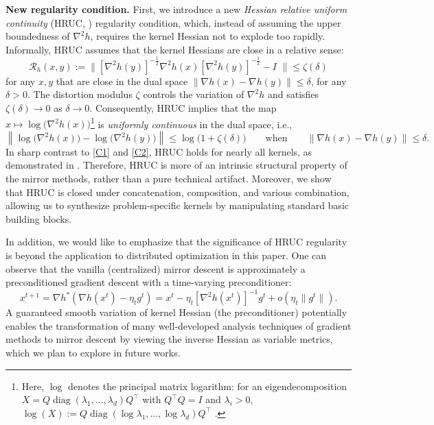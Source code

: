 \documentclass{article}
\theoremstyle{plain}
\theoremstyle{definition}
\theoremstyle{remark}
\newcommand{\cR}{\mathcal{R}}
\begin{document}
\noindent\textbf{New regularity condition. } First, we introduce a new \emph{Hessian relative uniform continuity} (HRUC, ) regularity condition, which, instead of assuming the upper boundedness of $\nabla^2 h$, requires the kernel Hessian  not to explode too rapidly. Informally, HRUC assumes that the kernel Hessians are close in a relative sense:
\begin{equation} 
    \cR_h(x,y):=\Big\|\left[\nabla^2h(y)\right]^{-\frac12}\nabla^2h(x)\left[\nabla^2h(y)\right]^{-\frac12}-I\,\,\Big\|\leq \zeta(\delta) 
\end{equation}
for any $x,y$ that are close in the dual space $\|\nabla h(x)-\nabla h(y)\|\leq\delta$, for any $\delta>0$. The distortion modulus $\zeta$ controls the variation of $\nabla^2h$ and satisfies $\zeta(\delta)\to0$ as $\delta\to0$. Consequently, HRUC implies that the map $x\mapsto\log\!\big(\nabla^2h(x)\big)$\footnote{Here, $\log$ denotes the principal matrix logarithm: for an eigendecomposition $X=Q\operatorname{diag}(\lambda_1,\ldots,\lambda_d)Q^\top$ with $Q^\top Q=I$ and $\lambda_i>0$, $\log(X):=Q\operatorname{diag}(\log\lambda_1,\ldots,\log\lambda_d)Q^\top$ \cite[Chapter~11]{Higham2008}.} is \emph{uniformly continuous} in the dual space, i.e.,
\begin{equation*}
    \left\|\log\!\big(\nabla^2h(x)\big)-\log\!\big(\nabla^2h(y)\big)\right\|
    \leq \log\!\big(1+\zeta(\delta)\big)
    \qquad \text{when}\qquad \|\nabla h(x)-\nabla h(y)\|\leq\delta.
\end{equation*}
In sharp contrast to \ref{C1} and \ref{C2}, HRUC holds for nearly all kernels, as demonstrated in . Therefore, HRUC is more of an intrinsic structural property of the mirror methods, rather than a pure technical artifact. Moreover, we show that HRUC is closed under concatenation, composition, and various combination, allowing us to synthesize problem-specific kernels by manipulating standard basic building blocks. 

In addition, we would like to emphasize that the significance of HRUC regularity is beyond the application to distributed optimization in this paper. One can observe that the vanilla (centralized) mirror descent is approximately a preconditioned gradient descent with a time-varying preconditioner: 
\[x^{t+1} = \nabla h^*(\nabla h(x^t)-\eta_t g^t) = x^t - \eta_t[\nabla^2h(x^t)]^{-1}g^t + o(\eta_t\|g^t\|).\]
A guaranteed smooth variation of kernel Hessian (the preconditioner) potentially enables the transformation of many well-developed analysis techniques of gradient methods to mirror descent by viewing the inverse Hessian as variable metrics, which we plan to explore in future works. \vspace{0.2cm}
\end{document}
